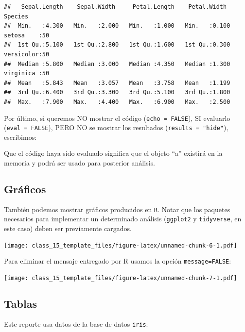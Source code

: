 \documentclass[
]{article}
\begin{document}
\begin{verbatim}
##   Sepal.Length    Sepal.Width     Petal.Length    Petal.Width          Species  
##  Min.   :4.300   Min.   :2.000   Min.   :1.000   Min.   :0.100   setosa    :50  
##  1st Qu.:5.100   1st Qu.:2.800   1st Qu.:1.600   1st Qu.:0.300   versicolor:50  
##  Median :5.800   Median :3.000   Median :4.350   Median :1.300   virginica :50  
##  Mean   :5.843   Mean   :3.057   Mean   :3.758   Mean   :1.199                  
##  3rd Qu.:6.400   3rd Qu.:3.300   3rd Qu.:5.100   3rd Qu.:1.800                  
##  Max.   :7.900   Max.   :4.400   Max.   :6.900   Max.   :2.500
\end{verbatim}

Por último, si queremos NO mostrar el código (\texttt{echo\ =\ FALSE}),
SI evaluarlo (\texttt{eval\ =\ FALSE}), PERO NO se mostrar los
resultados (\texttt{results\ =\ "hide"}), escribimos:

Que el código haya sido evaluado significa que el objeto ``a'' existirá
en la memoria y podrá ser usado para posterior análisis.

\hypertarget{gruxe1ficos}{%
\subsection{Gráficos}\label{gruxe1ficos}}

También podemos mostrar gráficos producidos en \texttt{R}. Notar que los
paquetes necesarios para implementar un determinado análisis
(\texttt{ggplot2} y \texttt{tidyverse}, en este caso) deben ser
previamente cargados.

\texttt{[image: class\_15\_template\_files/figure-latex/unnamed-chunk-6-1.pdf]}

Para eliminar el mensaje entregado por R usamos la opción
\texttt{message=FALSE}:

\texttt{[image: class\_15\_template\_files/figure-latex/unnamed-chunk-7-1.pdf]}

\hypertarget{tablas}{%
\subsection{Tablas}\label{tablas}}

Este reporte usa datos de la base de datos \texttt{iris}:
\end{document}

